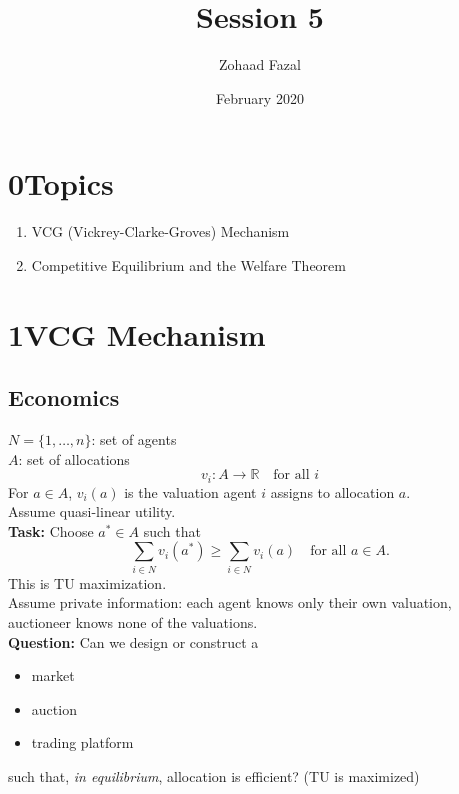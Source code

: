 \documentclass{article}
\title{Session 5}
\author{Zohaad Fazal}
\date{February 2020}
\begin{document}
\maketitle
\section*{0\quad Topics}
\begin{enumerate}
    \item VCG (Vickrey-Clarke-Groves) Mechanism
    \item Competitive Equilibrium and the Welfare Theorem
\end{enumerate}

\section*{1\quad VCG Mechanism}
\subsection*{Economics}
$N=\{1,\dots,n\}$: set of agents\\
$A$: set of allocations
\begin{equation*}
    v_i:A\to\mathbb{R}\quad\text{for all }i
\end{equation*}
For $a\in A$, $v_i(a)$ is the valuation agent $i$ assigns to allocation $a$.\\

\noindent
Assume quasi-linear utility.\\
\noindent
\textbf{Task:} Choose $a^*\in A$ such that
\begin{equation*}
    \sum_{i\in N}v_i(a^*)\geq\sum_{i\in N}v_i(a)\quad\text{for all }a\in A.
\end{equation*}
This is TU maximization.\\

\noindent
Assume private information: each agent knows only their own valuation, auctioneer knows none of the valuations.\\

\noindent
\textbf{Question:} Can we design or construct a
\begin{itemize}
    \item market
    \item auction
    \item trading platform
\end{itemize}
such that, \textit{in equilibrium}, allocation is efficient? (TU is maximized)\\
\end{document}
